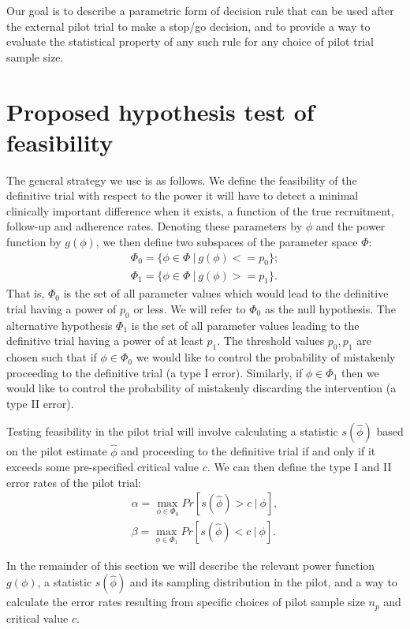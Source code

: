 \documentclass[AMA,STIX1COL]{WileyNJD-v2}
\begin{document}
Our goal is to describe a parametric form of decision rule that can be used after the external pilot trial to make a stop/go decision, and to provide a way to evaluate the statistical property of any such rule for any choice of pilot trial sample size.

\section{Proposed hypothesis test of feasibility}\label{sec:methods}

The general strategy we use is as follows. We define the feasibility of the definitive trial with respect to the power it will have to detect a minimal clinically important difference when it exists, a function of the true recruitment, follow-up and adherence rates. Denoting these parameters by $\phi$ and the power function by $g(\phi)$, we then define two subspaces of the parameter space $\Phi$:
\begin{align*}
\Phi_0 = \{\phi \in \Phi ~ | ~ g(\phi) <= p_0 \}; \\
\Phi_1 = \{\phi \in \Phi ~ | ~ g(\phi) >= p_1 \}.
\end{align*}
That is, $\Phi_0$ is the set of all parameter values which would lead to the definitive trial having a power of $p_0$ or less. We will refer to $\Phi_0$ as the null hypothesis. The alternative hypothesis $\Phi_1$ is the set of all parameter values leading to the definitive trial having a power of at least $p_1$. The threshold values $p_0, p_1$ are chosen such that if $\phi \in \Phi_0$ we would like to control the probability of mistakenly proceeding to the definitive trial (a type I error). Similarly, if $\phi \in \Phi_1$ then we would like to control the probability of mistakenly discarding the intervention (a type II error).

Testing feasibility in the pilot trial will involve calculating a statistic $s(\hat{\phi})$ based on the pilot estimate $\hat{\phi}$ and proceeding to the definitive trial if and only if it exceeds some pre-specified  critical value $c$. We can then define the type I and II error rates of the pilot trial:
\begin{align}\label{eqn:ocs}
\alpha = \max_{\phi \in \Phi_0} Pr[ s(\hat{\phi}) > c ~ | ~ \phi], \\
\beta = \max_{\phi \in \Phi_1} Pr[ s(\hat{\phi}) < c ~ | ~ \phi].
\end{align}

In the remainder of this section we will describe the relevant power function $g(\phi)$, a statistic $s(\hat{\phi})$ and its sampling distribution in the pilot, and a way to calculate the error rates resulting from specific choices of pilot sample size $n_p$ and critical value $c$.
\end{document}
